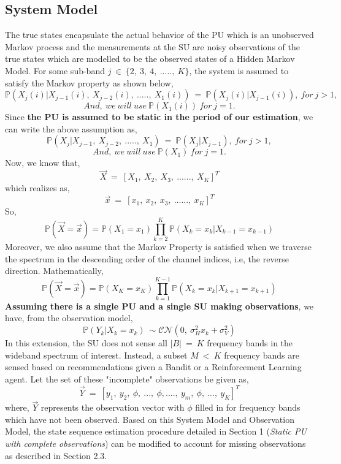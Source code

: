 \documentclass[12pt, draftcls, onecolumn]{IEEEtran}
\begin{document}
\subsection{System Model}
The true states encapsulate the actual behavior of the PU which is an unobserved Markov process and the measurements at the SU are noisy observations of the true states which are modelled to be the observed states of a Hidden Markov Model.
For some sub-band $j\ \in\ \{2,\ 3,\ 4,\ .....,\ K\}$, the system is assumed to satisfy the Markov property as shown below,
\[\mathbb P(X_{j}(i)|X_{j-1}(i),\ X_{j-2}(i),\ .....,\ X_1(i))\ =\ \mathbb P(X_{j}(i)|X_{j-1}(i)),\ for\ j>1,\]
\[And,\ we\ will\ use\ \mathbb P(X_1(i))\ for\ j=1.\]
Since \textbf{the PU is assumed to be static in the period of our estimation}, we can write the above assumption as,
\[\mathbb P(X_{j}|X_{j-1},\ X_{j-2},\ .....,\ X_1)\ =\ \mathbb P(X_{j}|X_{j-1}),\ for\ j>1,\]
\[And,\ we\ will\ use\ \mathbb P(X_1)\ for\ j=1.\]
Now, we know that,
\[\vec{X}\ =\ [X_1,\ X_2,\ X_3,\ ......,\ X_K]^T\] which realizes as,
\[\vec{x}\ =\ [x_1,\ x_2,\ x_3,\ ......,\ x_K]^T\]
So,
\begin{equation}\label{30}
    \mathbb P(\vec{X}=\vec{x}) = \mathbb P(X_1=x_1) \prod_{k=2}^{K} \mathbb P(X_k=x_k|X_{k-1}=x_{k-1})
\end{equation}
Moreover, we also assume that the Markov Property is satisfied when we traverse the spectrum in the descending order of the channel indices, i.e, the reverse direction. Mathematically,
\begin{equation*}
\mathbb P(\vec{X}=\vec{x})=\mathbb P(X_K=x_K)\prod_{k=1}^{K-1} \mathbb P(X_{k}=x_k|X_{k+1}=x_{k+1})
\end{equation*}
\textbf{Assuming there is a single PU and a single SU making observations}, we have, from the observation model,
\begin{equation}\label{31}
    \mathbb P(Y_k|X_k = x_k)\ \sim \mathcal{CN}(0,\ \sigma_H^2x_k+\sigma_V^2)
\end{equation}
In this extension, the SU does not sense all $|B|\ =\ K$ frequency bands in the wideband spectrum of interest. Instead, a subset $M\ <\ K$ frequency bands are sensed based on recommendations given a Bandit or a Reinforcement Learning agent. Let the set of these "incomplete" observations be given as,
\[\vec{Y}\ =\ [y_1,\ y_2,\ \phi,\ ...,\ \phi,....,\ y_m,\ \phi,\ ...,\ y_K]^T\]
where, $\vec{Y}$ represents the observation vector with $\phi$ filled in for frequency bands which have not been observed.
Based on this System Model and Observation Model, the state sequence estimation procedure detailed in Section 1 (\textit{Static PU with complete observations}) can be modified to account for missing observations as described in Section 2.3.
\end{document}
